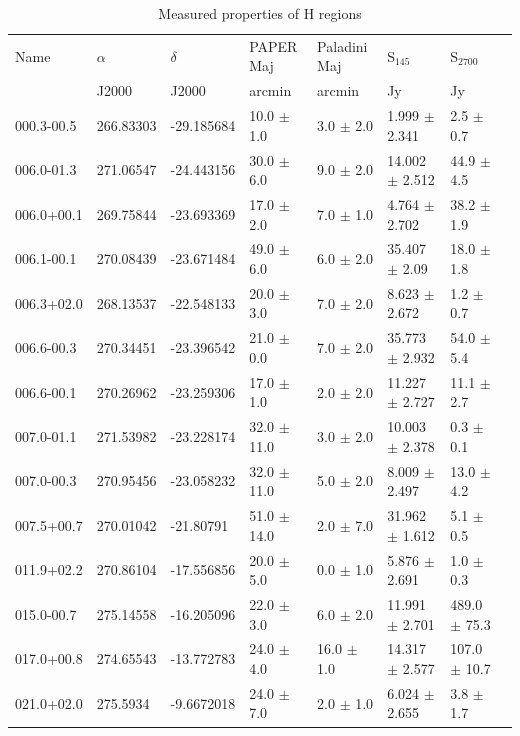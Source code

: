 \documentclass[useAMS,usenatbib]{mn2e}
\begin{document}
\begin{table}
\caption{Measured properties of {H} regions}
\begin{tabular}{llllllll}
\hline
Name &  $\alpha$   &  $\delta$  &  PAPER Maj   &  Paladini Maj &  S$_{145}$  &  S$_{2700}$\\
 & J2000  &  J2000  &  arcmin  &  arcmin  &  Jy  &  Jy\\
\hline
000.3-00.5  &  266.83303  &  -29.185684  &  10.0 $\pm$ 1.0  &  3.0 $\pm$ 2.0  &  1.999 $\pm$ 2.341  &  2.5 $\pm$ 0.7 \\
006.0-01.3  &  271.06547  &  -24.443156  &  30.0 $\pm$ 6.0  &  9.0 $\pm$ 2.0  &  14.002 $\pm$ 2.512  &  44.9 $\pm$ 4.5 \\
006.0+00.1  &  269.75844  &  -23.693369  &  17.0 $\pm$ 2.0 &  7.0 $\pm$ 1.0  &  4.764 $\pm$ 2.702  &  38.2 $\pm$ 1.9 \\
006.1-00.1  &  270.08439  &  -23.671484  &  49.0 $\pm$ 6.0 &  6.0 $\pm$ 2.0  &  35.407 $\pm$ 2.09  &  18.0 $\pm$ 1.8 \\
006.3+02.0  &  268.13537  &  -22.548133  &  20.0 $\pm$ 3.0 &  7.0 $\pm$ 2.0  &  8.623 $\pm$ 2.672  &  1.2 $\pm$ 0.7 \\
006.6-00.3  &  270.34451  &  -23.396542  &  21.0 $\pm$ 0.0  & 7.0 $\pm$ 2.0  &  35.773 $\pm$ 2.932  &  54.0 $\pm$ 5.4 \\
006.6-00.1  &  270.26962  &  -23.259306  &  17.0 $\pm$ 1.0  & 2.0 $\pm$ 2.0  &  11.227 $\pm$ 2.727  &  11.1 $\pm$ 2.7 \\
007.0-01.1  &  271.53982  &  -23.228174  &  32.0 $\pm$ 11.0  & 3.0 $\pm$ 2.0  &  10.003 $\pm$ 2.378  &  0.3 $\pm$ 0.1 \\
007.0-00.3  &  270.95456  &  -23.058232  &  32.0 $\pm$ 11.0  & 5.0 $\pm$ 2.0  &  8.009 $\pm$ 2.497  &  13.0 $\pm$ 4.2 \\
007.5+00.7  &  270.01042  &  -21.80791  &  51.0 $\pm$ 14.0  & 2.0 $\pm$ 7.0  &  31.962 $\pm$ 1.612  &  5.1 $\pm$ 0.5 \\
011.9+02.2  &  270.86104  &  -17.556856  &  20.0 $\pm$ 5.0 &  0.0 $\pm$ 1.0  &  5.876 $\pm$ 2.691  &  1.0 $\pm$ 0.3 \\
015.0-00.7  &  275.14558  &  -16.205096  &  22.0 $\pm$ 3.0  & 6.0 $\pm$ 2.0  &  11.991 $\pm$ 2.701  &  489.0 $\pm$ 75.3 \\
017.0+00.8  &  274.65543  &  -13.772783  &  24.0 $\pm$ 4.0  & 16.0 $\pm$ 1.0  &  14.317 $\pm$ 2.577  &  107.0 $\pm$ 10.7 \\
021.0+02.0  &  275.5934  &  -9.6672018  &  24.0 $\pm$ 7.0  & 2.0 $\pm$ 1.0  &  6.024 $\pm$ 2.655  &  3.8 $\pm$ 1.7 \\

\end{tabular}
\end{table}
\end{document}
